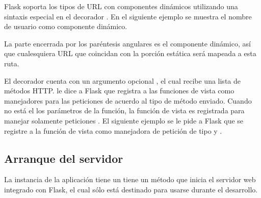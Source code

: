 Flask soporta los tipos de URL con componentes dinámicos utilizando
una sintaxis especial en el decorador . En el siguiente ejemplo se
muestra el nombre de usuario como componente dinámico.

\begin{sphinxVerbatim}[commandchars=\\\{\}]
 
   
\end{sphinxVerbatim}

La parte encerrada por los paréntesis angulares es el componente dinámico, así
que cualesquiera URL que coincidan con la porción estática será mapeada a esta
ruta.

El decorador  cuenta con un argumento opcional ,
el cual recibe
una lista de métodos HTTP.  le dice a Flask que registra a las
funciones de vista como manejadores para las peticiones de acuerdo
al tipo de método enviado. Cuando  no está el los parámetros de la
función, la función de vista es registrada para manejar solamente peticiones
. El siguiente ejemplo se le pide a Flask que se registre a la
función de vista como manejadora de petición de tipo  y .

\begin{sphinxVerbatim}[commandchars=\\\{\}]
 \PYG{p}{[} \PYG{p}{]}
 
   
\end{sphinxVerbatim}


\subsection*{Arranque del servidor}
\label{\detokenize{chapter_two/desc_cloudnao:arranque-del-servidor}}
La instancia de la aplicación tiene un tiene un método  que inicia el
servidor web integrado con Flask, el cual sólo está destinado para usarse
durante el desarrollo.

